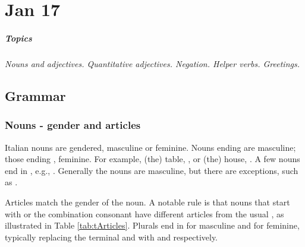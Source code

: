 \chapter{Jan 17}
\paragraph{Topics}
\textit{Nouns and adjectives. Quantitative adjectives. Negation. Helper verbs. Greetings.}

\section{Grammar}
\subsection{Nouns - gender and articles}

Italian nouns are gendered, masculine or feminine. Nouns ending  are masculine; 
those ending , feminine. For example, (the) table, , or (the) house, 
. A few nouns end in , e.g., . 
Generally the  nouns are masculine, but there are exceptions, such as .

Articles match the gender of the noun. A notable rule is that nouns that start with  
or the combination  consonant have different articles from the usual , 
as illustrated in Table \ref{tab:tArticles}. Plurals end in  for masculine and 
for feminine, typically replacing the terminal  and  with  and 
respectively. 

